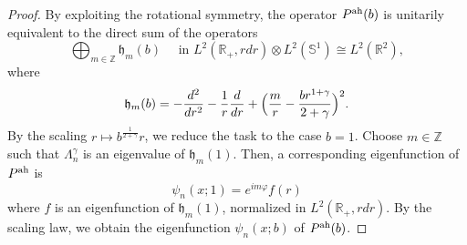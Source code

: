 \documentclass[11pt]{amsart}
\theoremstyle{remark}
\newcommand{\R}{\mathbb{R}}
\numberwithin{equation}{section}
\begin{document}
\begin{proof}
    By exploiting the rotational symmetry, the operator $P^{\rm ah}(b)$ is unitarily equivalent to the direct sum of the operators
    \[\bigoplus_{m\in\mathbb Z}\mathfrak h_m(b) \quad\mbox{ in }L^2(\R_+,rdr)\otimes L^2(\mathbb S^1)\cong L^2(\R^2), \]
    where
    \[\mathfrak h_m(b)=-\frac{d^2}{dr^2}-\frac{1}{r}\frac{d}{dr}+\Bigl(\frac{m}{r}-\frac{b r^{1+\gamma}}{2+\gamma} \Bigr)^2.\]
    By the scaling $r\mapsto b^{\frac{1}{2+\gamma}} r$, we reduce the task to the case $b=1$. Choose $m\in\mathbb Z$ such that $\Lambda_n^\gamma$ is an eigenvalue of $\mathfrak h_m(1)$. Then, a corresponding eigenfunction of $P^{\rm ah}$ is
    \[\psi_n(x;1)=e^{im\varphi}f(r)\]
    where $f$ is an eigenfunction of $\mathfrak h_m(1)$, normalized in $L^2(\R_+,rdr)$. By the scaling law, we obtain the eigenfunction $\psi_n(x;b)$ of $P^{\rm ah}(b)$.


\end{proof}
\end{document}
